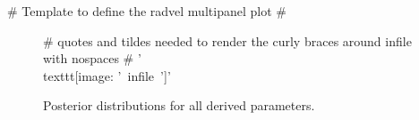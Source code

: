 {# Template to define the radvel multipanel plot #} 
\begin{figure*}[!h]
\centering
{# quotes and tildes needed to render the curly braces around infile with nospaces #}
{{'\\texttt{[image: '~infile~']}'}}
\caption{Posterior distributions for all derived parameters.}
\end{figure*}
